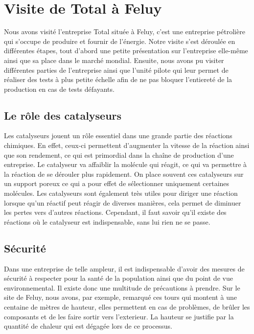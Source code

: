 \section{Visite de Total à Feluy}

Nous avons visité l'entreprise Total située à Feluy, c'est une entreprise pétrolière qui s'occupe de produire et fournir de l'énergie. Notre visite s'est déroulée en différentes étapes, tout d'abord une petite présentation sur l'entreprise elle-même ainsi que sa place dans le marché mondial. Ensuite, nous avons pu visiter différentes parties de l'entreprise ainsi que l'unité pilote qui leur permet de réaliser des tests à plus petite échelle afin de ne pas bloquer l'entiereté de la production en cas de tests défayants.

\subsection{Le rôle des catalyseurs}

Les catalyseurs jouent un rôle essentiel dans une grande partie des réactions chimiques. En effet, ceux-ci permettent d'augmenter la vitesse de la réaction ainsi que son rendement, ce qui est primordial dans la chaîne de production d'une entreprise. Le catalyseur va affaiblir la molécule qui réagit, ce qui va permettre à la réaction de se dérouler plus rapidement.
On place souvent ces catalyseurs sur un support poreux ce qui a pour effet de sélectionner uniquement certaines molécules. Les catalyseurs sont également très utiles pour diriger une réaction lorsque qu'un réactif peut réagir de diverses manières, cela permet de diminuer les pertes vers d'autres réactions. Cependant, il faut savoir qu'il existe des réactions où le catalyseur est indispensable, sans lui rien ne se passe.

\subsection{Sécurité}

Dans une entreprise de telle ampleur, il est indispensable d'avoir des mesures de sécurité à respecter pour la santé de la population ainsi que du point de vue environnemental. Il existe donc une multitude de précautions à prendre. Sur le site de Feluy, nous avons, par exemple, remarqué ces tours qui montent à une centaine de mètres de hauteur, elles permettent en cas de problèmes, de brûler les composants et de les faire sortir vers l'exterieur. La hauteur se justifie par la quantité de chaleur qui est dégagée lors de ce processus.

